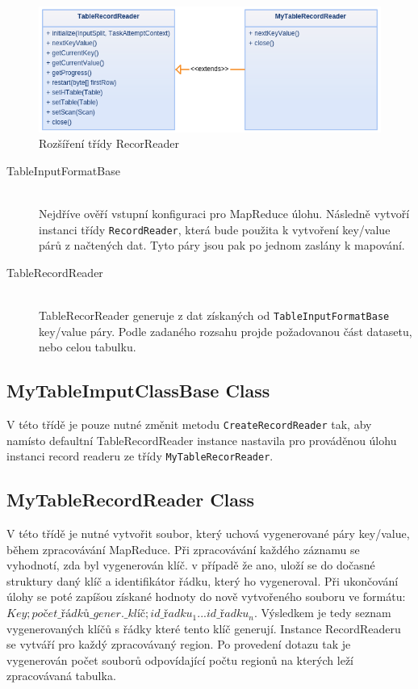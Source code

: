 \documentclass[thesis=M,czech]{FITthesis}[2012/06/26]
\begin{document}
\begin{figure}\centering
	\includegraphics[width=1\textwidth, angle=0]{files/record}
	\caption[Rozšíření třídy RecorReader]
	{Rozšíření třídy RecorReader}\label{fig:record}
\end{figure} 

\begin{description}
\item[TableInputFormatBase] \hfill \\
Nejdříve ověří vstupní konfiguraci pro MapReduce úlohu. Následně \linebreak vytvoří instanci třídy \texttt{RecordReader}, která bude použita k vytvoření key/value párů z načtených dat. Tyto páry jsou pak po jednom zaslány k mapování.

\item[TableRecordReader] \hfill \\
TableRecorReader generuje z dat získaných od \texttt{TableInputFormatBase} key/value páry. Podle zadaného rozsahu projde požadovanou část datasetu, nebo celou tabulku. 
\end{description}

\subsection{MyTableImputClassBase Class}
V této třídě je pouze nutné změnit metodu \texttt{CreateRecordReader} tak, aby \linebreak namísto defaultní TableRecordReader instance nastavila pro prováděnou úlohu instanci record readeru ze třídy \texttt{MyTableRecorReader}.


\subsection{MyTableRecordReader Class}
V této třídě je nutné vytvořit soubor, který uchová vygenerované páry \linebreak key/value, během zpracovávání MapReduce. Při zpracovávání každého \linebreak záznamu se vyhodnotí, zda byl vygenerován klíč. v případě že ano, uloží se do dočasné struktury daný klíč a identifikátor řádku, který ho vygeneroval. Při ukončování úlohy se poté zapíšou získané hodnoty do nově vytvořeného souboru ve formátu:
 $Key;počet\_řádků\_gener.\_klíč;id\_řadku_1 ... id\_řadku_n$. Výsledkem je tedy seznam vygenerovaných klíčů s řádky které tento klíč generují. Instance RecordReaderu se vytváří pro každý zpracovávaný region. Po provedení dotazu tak je vygenerován počet souborů odpovídající počtu regionů na kterých leží zpracovávaná tabulka.
\end{document}

